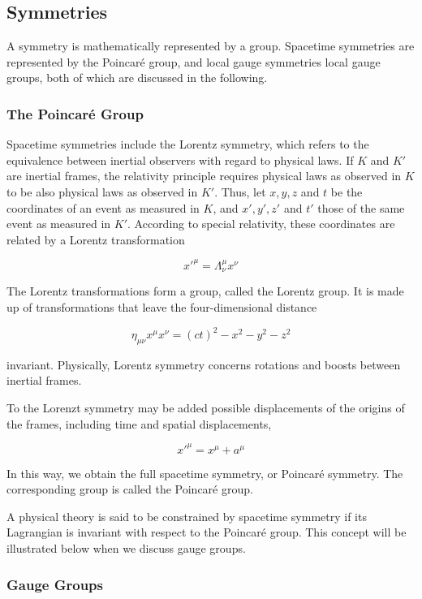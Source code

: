 \subsection{Symmetries}\label{s:smsymmetries}

A symmetry is mathematically represented by a group. Spacetime symmetries are
represented by the Poincar\'{e} group, and local gauge symmetries local gauge
groups, both of which are discussed in the following.

\subsubsection{The Poincar\'{e} Group}\label{sm:poincareg}

Spacetime symmetries include the Lorentz symmetry, which refers to the
equivalence between inertial observers with regard to physical laws. If $K$ and
$K'$ are inertial frames, the relativity principle requires physical laws as
observed in $K$ to be also physical laws as observed in $K'$. Thus, let $x, y,
	z$ and $t$ be the coordinates of an event as measured in $K$, and $x', y', z'$
and $t'$ those of the same event as measured in $K'$. According to special
relativity, these coordinates are related by a Lorentz transformation

$${x'}^\mu = \Lambda^\mu_\nu x^\nu$$

The Lorentz transformations form a group, called the Lorentz group. It is made
up of transformations that leave the four-dimensional distance


$$\eta_{\mu\nu} x^\mu x^\nu = (ct)^2 - x^2 -y^2 -z^2 $$

invariant. Physically, Lorentz symmetry concerns rotations and boosts between
inertial frames.

To the Lorenzt symmetry may be added possible displacements of the origins of
the frames, including time and spatial displacements,

$${x'}^\mu = x^{\mu} + a^{\mu} $$

In this way, we obtain the full spacetime symmetry, or Poincar\'{e} symmetry.
The corresponding group is called the Poincar\'{e} group.

A physical theory is said to be constrained by spacetime symmetry if its
Lagrangian is invariant with respect to the Poincar\'{e} group. This concept
will be illustrated below when we discuss gauge groups.

\subsubsection{Gauge Groups}

